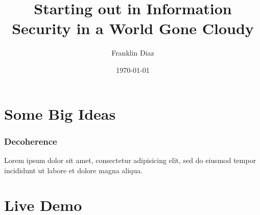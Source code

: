 \documentclass[14pt]{beamer}
\title{Starting out in Information Security in a World Gone Cloudy}
\author{Franklin Diaz}
\date{\today}
\begin{document}
\section{Some Big Ideas}

\begin{frame}
\frametitle{Decoherence}
Lorem ipsum dolor sit amet, consectetur adipisicing elit, sed do eiusmod tempor incididunt ut labore et dolore magna aliqua.
\end{frame}

\section{Live Demo}
\end{document}

